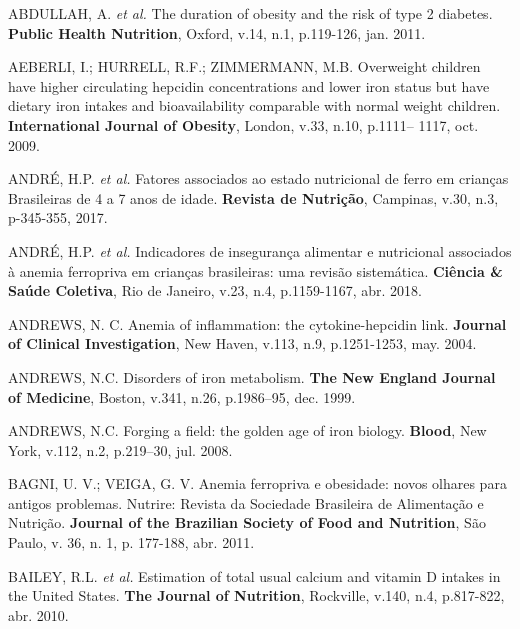 \noindent ABDULLAH, A. \textit{et al.} The duration of obesity and the risk of type 2 diabetes. \textbf{Public Health Nutrition}, Oxford, v.14, n.1, p.119-126, jan. 2011.  

\bigbreak

\noindent AEBERLI, I.; HURRELL, R.F.; ZIMMERMANN, M.B. Overweight children have higher circulating hepcidin concentrations and lower iron status but have dietary iron intakes and bioavailability comparable with normal weight children. \textbf{International Journal of Obesity}, London, v.33, n.10, p.1111– 1117, oct. 2009. 

\bigbreak

\noindent ANDRÉ, H.P. \textit{et al.} Fatores associados ao estado nutricional de ferro em crianças Brasileiras de 4 a 7 anos de idade. \textbf{Revista de Nutrição}, Campinas, v.30, n.3, p-345-355, 2017.

\bigbreak

\noindent ANDRÉ, H.P. \textit{et al.} Indicadores de insegurança alimentar e nutricional associados à anemia ferropriva em crianças brasileiras: uma revisão sistemática. \textbf{Ciência \& Saúde Coletiva}, Rio de Janeiro, v.23, n.4, p.1159-1167, abr. 2018.

\bigbreak

\noindent ANDREWS, N. C. Anemia of inflammation: the cytokine-hepcidin link. \textbf{Journal of Clinical Investigation}, New Haven, v.113, n.9, p.1251-1253, may. 2004.

\bigbreak

\noindent ANDREWS, N.C. Disorders of iron metabolism. \textbf{The New England Journal of Medicine}, Boston, v.341, n.26, p.1986–95, dec. 1999.

\bigbreak

\noindent ANDREWS, N.C. Forging a field: the golden age of iron biology. \textbf{Blood}, New York, v.112, n.2, p.219–30, jul. 2008.

\bigbreak

\noindent BAGNI, U. V.; VEIGA, G. V. Anemia ferropriva e obesidade: novos olhares para antigos problemas. Nutrire: Revista da Sociedade Brasileira de Alimentação e Nutrição. \textbf{Journal of the Brazilian Society of Food and Nutrition}, São Paulo, v. 36, n. 1, p. 177-188, abr. 2011.

\bigbreak

\noindent BAILEY, R.L. \textit{et al.} Estimation of total usual calcium and vitamin D intakes in the United States. \textbf{The Journal of Nutrition}, Rockville, v.140, n.4, p.817-822, abr. 2010.


